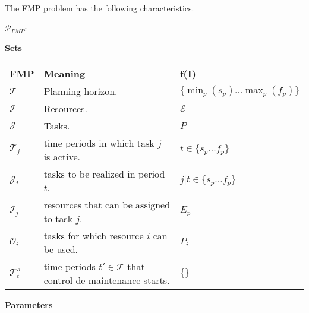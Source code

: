 \documentclass[a4paper,11pt]{article}
\begin{document}



    The FMP problem has the following characteristics.

    $\mathcal{P}_{FMP}$:

    \vskip 0.3cm

    \textbf{Sets}

    \begin{tabular}{l|l|l}
    	\textbf{FMP}    &  \textbf{Meaning} & \textbf{f(I)} \\ \hline
        $\mathcal{T}$    &  Planning horizon. & $\{\min_p({s_p}) ... \max_p({f_p})\}$ \\
        $\mathcal{I}$    &  Resources. & $ \mathcal{E}$ \\
        $\mathcal{J}$    &  Tasks.  & $ P$ \\
        $\mathcal{T}_j$  &  time periods in which task $j$ is active. & $t \in \{s_p ... f_p\}$ \\
        $\mathcal{J}_t$  &  tasks to be realized in period $t$. & $j | t \in \{s_p ... f_p\}$ \\
        $\mathcal{I}_j$  &  resources that can be assigned to task $j$. & $E_p$\\
        $\mathcal{O}_i$  &  tasks for which resource $i$ can be used. & $P_i$ \\
        $\mathcal{T}^{s}_t$ &  time periods $t' \in \mathcal{T}$ that control de maintenance starts. & $\{\}$ \\
    \end{tabular}

    \vskip 0.3cm

    \textbf{Parameters}
\end{document}
